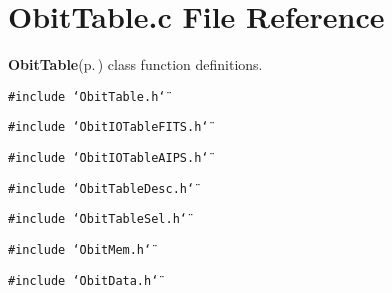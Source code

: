 \section{Obit\-Table.c File Reference}
\label{ObitTable_8c}
{\bf Obit\-Table}{\rm (p.\,\pageref{structObitTable})} class function definitions. 

{\tt \#include \char`\"{}Obit\-Table.h\char`\"{}}\par
{\tt \#include \char`\"{}Obit\-IOTable\-FITS.h\char`\"{}}\par
{\tt \#include \char`\"{}Obit\-IOTable\-AIPS.h\char`\"{}}\par
{\tt \#include \char`\"{}Obit\-Table\-Desc.h\char`\"{}}\par
{\tt \#include \char`\"{}Obit\-Table\-Sel.h\char`\"{}}\par
{\tt \#include \char`\"{}Obit\-Mem.h\char`\"{}}\par
{\tt \#include \char`\"{}Obit\-Data.h\char`\"{}}\par
